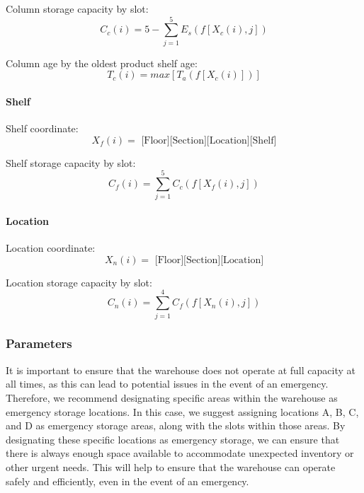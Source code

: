     Column storage capacity by slot: 
    \begin{equation}\label{eq:column capacity}
        C_c(i) = 5 - \sum_{j=1}^{5} E_s(f[X_c(i),j])
    \end{equation}

    Column age by the oldest product shelf age: 
    \begin{equation}\label{eq:column age}
        T_c(i) = max[T_a(f[X_c(i)])]
    \end{equation}

\paragraph{Shelf}\mbox{}

    Shelf coordinate:
    \begin{equation}\label{eq:shelf coordinate}
        X_f(i) = \text{ [Floor][Section][Location][Shelf]}
    \end{equation}
    
    Shelf storage capacity by slot: 
    \begin{equation}\label{eq:shelf capacity}
        C_f(i) = \sum_{j=1}^{5} C_c(f[X_f(i),j])
    \end{equation}

\paragraph{Location}\mbox{}

    Location coordinate:
    \begin{equation}\label{eq:location coordinate}
        X_n(i) = \text{ [Floor][Section][Location]}
    \end{equation}
    
    Location storage capacity by slot: 
    \begin{equation}\label{eq:location capacity}
        C_n(i) = \sum_{j=1}^{4} C_f(f[X_n(i),j])
    \end{equation}

\subsubsection{Parameters}

It is important to ensure that the warehouse does not operate at full capacity at all times, as this can lead to potential issues in the event of an emergency. Therefore, we recommend designating specific areas within the warehouse as emergency storage locations. In this case, we suggest assigning locations A, B, C, and D as emergency storage areas, along with the slots within those areas. By designating these specific locations as emergency storage, we can ensure that there is always enough space available to accommodate unexpected inventory or other urgent needs. This will help to ensure that the warehouse can operate safely and efficiently, even in the event of an emergency.

